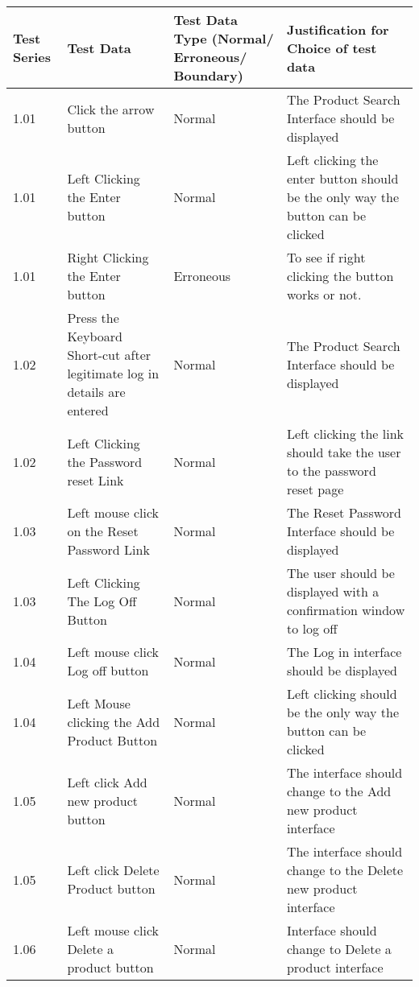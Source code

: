 	\begin{flushleft}
    \begin{longtable}{|p{1.5cm}|p{2.5cm}|p{2cm}|p{4.5cm}|}
        \hline
        \textbf{Test Series} & \textbf{Test Data} & \textbf{Test Data Type (Normal/ Erroneous/ Boundary)} &  \textbf{Justification for Choice of test data}\\ \hline
	\rowcolor{dark-grey}1.01 & Click the arrow button & Normal & The Product Search Interface should be displayed  \\ \hline
	\rowcolor{light-grey}1.01 & Left Clicking the Enter button & Normal &  Left clicking the enter button should be the only way the button can be clicked \\ \hline
	\rowcolor{light-grey}1.01 & Right Clicking the Enter button & Erroneous & To see if right clicking the button works or not. \\ \hline
	\rowcolor{dark-grey}1.02 & Press the Keyboard Short-cut after legitimate log in details are entered &  Normal & The Product Search Interface should be displayed \\ \hline
	\rowcolor{light-grey}1.02 & Left Clicking the Password reset Link &  Normal & Left clicking the link should take the user to the password reset page \\ \hline
	\rowcolor{dark-grey}1.03 & Left mouse click on the Reset Password Link &  Normal & The Reset Password Interface should be displayed  \\ \hline
	\rowcolor{light-grey}1.03 & Left Clicking The Log Off Button &  Normal & The user should be displayed with a confirmation window to log off  \\ \hline
	\rowcolor{dark-grey}1.04 & Left mouse click Log off button &  Normal & The Log in interface should be displayed  \\ \hline
	\rowcolor{light-grey}1.04 & Left Mouse clicking the Add Product Button &  Normal & Left clicking should be the only way the button can be clicked  \\ \hline
	\rowcolor{dark-grey}1.05 & Left click Add new product button &  Normal &  The interface should change to the Add new product interface \\ \hline
	\rowcolor{light-grey}1.05 & Left click Delete Product button &  Normal &  The interface should change to the Delete new product interface \\ \hline
	1.06 &  Left mouse click Delete a product button &  Normal & Interface should change to Delete a product interface \\ \hline

\end{longtable}
\end{flushleft}
